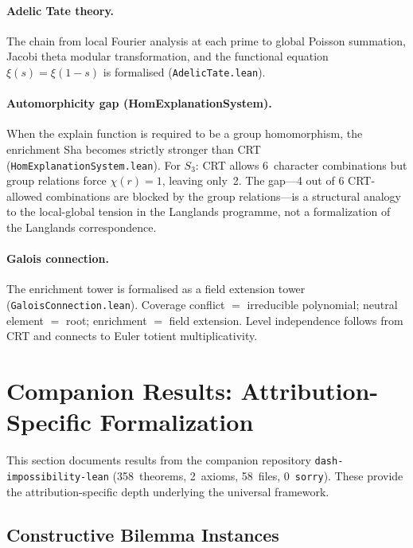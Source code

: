\documentclass[11pt,a4paper]{article}
\begin{document}
\paragraph{Adelic Tate theory.}
The chain from local Fourier analysis at each prime to global Poisson summation, Jacobi theta modular transformation, and the functional equation $\xi(s) = \xi(1-s)$ is formalised (\texttt{AdelicTate.lean}).

\paragraph{Automorphicity gap (HomExplanationSystem).}
When the explain function is required to be a group homomorphism, the enrichment Sha becomes strictly stronger than CRT (\texttt{HomExplanationSystem.lean}).  For $S_3$: CRT allows 6~character combinations but group relations force $\chi(r) = 1$, leaving only~2.  The gap---4 out of 6 CRT-allowed combinations are blocked by the group relations---is a structural analogy to the local-global tension in the Langlands programme, not a formalization of the Langlands correspondence.

\paragraph{Galois connection.}
The enrichment tower is formalised as a field extension tower (\texttt{GaloisConnection.lean}).  Coverage conflict $=$ irreducible polynomial; neutral element $=$ root; enrichment $=$ field extension.  Level independence follows from CRT and connects to Euler totient multiplicativity.


\section{Companion Results: Attribution-Specific Formalization}
\label{sec:companion-attribution}

This section documents results from the companion repository \texttt{dash-impossibility-lean} (358~theorems, 2~axioms, 58~files, 0~\texttt{sorry}).  These provide the attribution-specific depth underlying the universal framework.

\subsection{Constructive Bilemma Instances}
\end{document}
